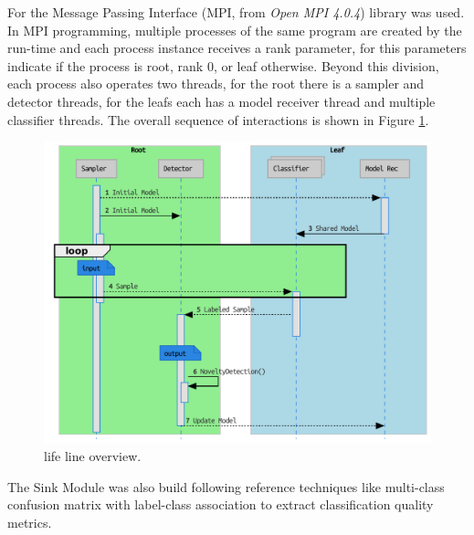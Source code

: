For \mfog the Message Passing Interface (MPI, from \emph{Open MPI 4.0.4}) library was used.
In MPI programming, multiple processes of the same program are created by the
run-time and each process instance receives a rank parameter, for \mfog this
parameters indicate if the process is root, rank $0$, or leaf otherwise.
Beyond this division, each process also operates two threads, for the root
there is a sampler and detector threads, for the leafs each has a model receiver
thread and multiple classifier threads.
The overall sequence of interactions is shown in Figure \ref{fig:mfog-mpi-life}.

\begin{figure}[htb]
  \centerline{
    \includegraphics[width=\whencolumns{0.7}{1}\columnwidth,page=1]{figures/lifecycle.uml.svg.pdf}
  }
  \caption{\mfog life line overview.}
  \label{fig:mfog-mpi-life}
\end{figure}

The Sink Module was also build following reference techniques like
multi-class confusion matrix with label-class association
\cite{Faria2016minas}
to extract classification quality metrics.
